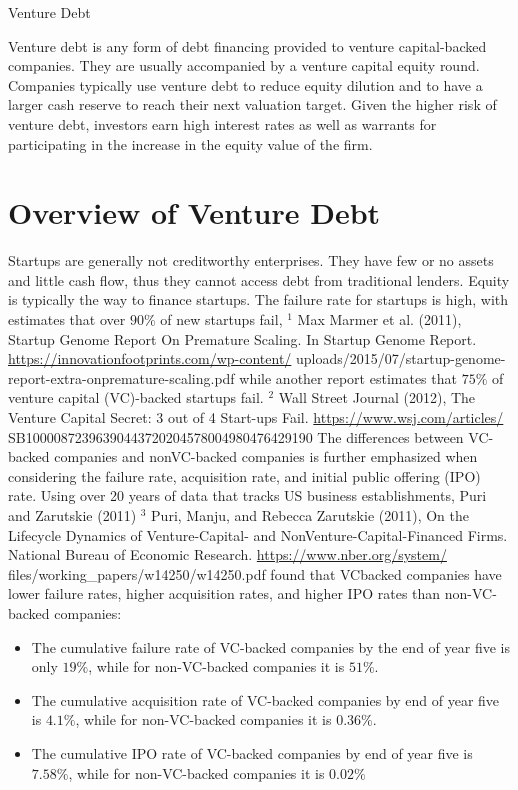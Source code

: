 \documentclass[11pt]{article}
\begin{document}
Venture Debt

Venture debt is any form of debt financing provided to venture capital-backed companies. They are usually accompanied by a venture capital equity round. Companies typically use venture debt to reduce equity dilution and to have a larger cash reserve to reach their next valuation target. Given the higher risk of venture debt, investors earn high interest rates as well as warrants for participating in the increase in the equity value of the firm.

\section*{Overview of Venture Debt}
Startups are generally not creditworthy enterprises. They have few or no assets and little cash flow, thus they cannot access debt from traditional lenders. Equity is typically the way to finance startups. The failure rate for startups is high, with estimates that over $90 \%$ of new startups fail, ${ }^{1}$ Max Marmer et al. (2011), Startup Genome Report On Premature Scaling. In Startup Genome Report. \href{https://innovationfootprints.com/wp-content/}{https://innovationfootprints.com/wp-content/} uploads/2015/07/startup-genome-report-extra-onpremature-scaling.pdf while another report estimates that $75 \%$ of venture capital (VC)-backed startups fail. ${ }^{2}$ Wall Street Journal (2012), The Venture Capital Secret: 3 out of 4 Start-ups Fail. \href{https://www.wsj.com/articles/}{https://www.wsj.com/articles/} SB10000872396390443720204578004980476429190 The differences between VC-backed companies and nonVC-backed companies is further emphasized when considering the failure rate, acquisition rate, and initial public offering (IPO) rate. Using over 20 years of data that tracks US business establishments, Puri and Zarutskie (2011) ${ }^{3}$ Puri, Manju, and Rebecca Zarutskie (2011), On the Lifecycle Dynamics of Venture-Capital- and NonVenture-Capital-Financed Firms. National Bureau of Economic Research. \href{https://www.nber.org/system/}{https://www.nber.org/system/} files/working\_papers/w14250/w14250.pdf found that VCbacked companies have lower failure rates, higher acquisition rates, and higher IPO rates than non-VC-backed companies:

\begin{itemize}
  \item The cumulative failure rate of VC-backed companies by the end of year five is only $19 \%$, while for non-VC-backed companies it is $51 \%$.
  \item The cumulative acquisition rate of VC-backed companies by end of year five is $4.1 \%$, while for non-VC-backed companies it is $0.36 \%$.
  \item The cumulative IPO rate of VC-backed companies by end of year five is $7.58 \%$, while for non-VC-backed companies it is $0.02 \%$
\end{itemize}
\end{document}
